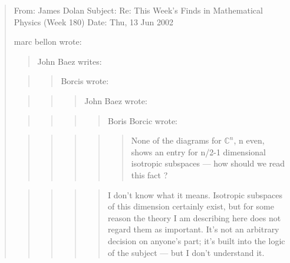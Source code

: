 \documentclass{article}
\begin{document}
\begin{quote}
From: James Dolan Subject: Re: This Week's Finds in Mathematical Physics
(Week 180) Date: Thu, 13 Jun 2002

marc bellon wrote:

\begin{quote}
John Baez writes:
\end{quote}

\begin{quote}
\begin{quote}
Borcis wrote:
\end{quote}
\end{quote}

\begin{quote}
\begin{quote}
\begin{quote}
John Baez wrote:
\end{quote}
\end{quote}
\end{quote}

\begin{quote}
\begin{quote}
\begin{quote}
\begin{quote}
Boris Borcic wrote:
\end{quote}
\end{quote}
\end{quote}
\end{quote}

\begin{quote}
\begin{quote}
\begin{quote}
\begin{quote}
\begin{quote}
None of the diagrams for \(\mathbb{C}^n\), n even, shows an entry for
n/2-1 dimensional isotropic subspaces --- how should we read this fact ?
\end{quote}
\end{quote}
\end{quote}
\end{quote}
\end{quote}

\begin{quote}
\begin{quote}
\begin{quote}
\begin{quote}
I don't know what it means. Isotropic subspaces of this dimension
certainly exist, but for some reason the theory I am describing here
does not regard them as important. It's not an arbitrary decision on
anyone's part; it's built into the logic of the subject --- but I don't
understand it.
\end{quote}
\end{quote}
\end{quote}
\end{quote}


\end{quote}
\end{document}
